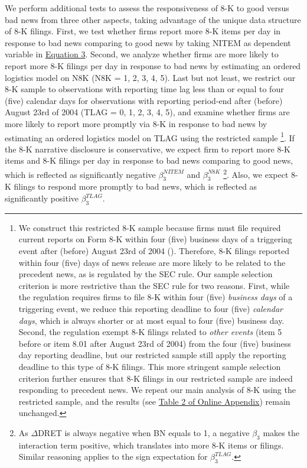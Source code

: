 \documentclass[a4paper]{article}
\begin{document}
\begin{spacing}{2}
We perform additional tests to assess the responsiveness of 8-K to good versus bad news from three other aspects, taking advantage of the unique data structure of 8-K filings. First, we test whether firms report more 8-K items per day in response to bad news comparing to good news by taking NITEM as dependent variable in \hyperref[eq3]{Equation 3}. Second, we analyze whether firms are more likely to report more 8-K filings per day in response to bad news by estimating an ordered logistics model on N8K (N8K = 1, 2, 3, 4, 5). Last but not least, we restrict our 8-K sample to observations with reporting time lag less than or equal to four (five) calendar days for observations with reporting period-end after (before) August 23rd of 2004 (TLAG = 0, 1, 2, 3, 4, 5), and examine whether firms are more likely to report more promptly via 8-K in response to bad news by estimating an ordered logistics model on TLAG using the restricted sample \footnote{We construct this restricted 8-K sample because firms must file required current reports on Form 8-K within four (five) business days of a triggering event after (before) August 23rd of 2004 (\cite{secFinalRuleAdditional2004}). Therefore, 8-K filings reported within four (five) days of news release are more likely to be related to the precedent news, as is regulated by the SEC rule. Our sample selection criterion is more restrictive than the SEC rule for two reasons. First, while the regulation requires firms to file 8-K within four (five) \textit{business days} of a triggering event, we reduce this reporting deadline to four (five) \textit{calendar days}, which is always shorter or at most equal to four (five) business day. Second, the regulation exempt 8-K filings related to \textit{other events} (item 5 before or item 8.01 after August 23rd of 2004) from the four (five) business day reporting deadline, but our restricted sample still apply the reporting deadline to this type of 8-K filings. This more stringent sample selection criterion further ensures that 8-K filings in our restricted sample are indeed responding to precedent news. We repeat our main analysis of 8-K using the restricted sample, and the results (see \hyperref[oat2]{Table 2 of Online Appendix}) remain unchanged. }. If the 8-K narrative disclosure is conservative, we expect firm to report more 8-K items and 8-K filings per day in response to bad news comparing to good news, which is reflected as significantly negative $\beta_3^{NITEM}$ and $\beta_3^{N8K}$ \footnote{As $\Delta$DRET is always negative when BN equals to 1, a negative $\beta_3$ makes the interaction term positive, which translates into more 8-K items or filings. Similar reasoning applies to the sign expectation for $\beta_3^{TLAG}$.}. Also, we expect 8-K filings to respond more promptly to bad news, which is reflected as significantly positive $\beta_3^{TLAG}$.


\end{spacing}
\end{document}
